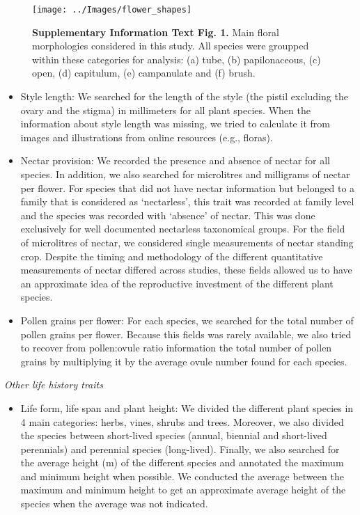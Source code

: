 \documentclass[
  12pt,
]{article}
\providecommand{\tightlist}{%
  \setlength{\itemsep}{0pt}\setlength{\parskip}{0pt}}
\begin{document}
\begin{figure}[h]

{\centering \texttt{[image: ../Images/flower\_shapes]} 

}

\caption{\textbf{Supplementary Information Text Fig. 1.}  Main floral morphologies considered in this study. All species were groupped within these categories for analysis: (a) tube, (b) papilonaceous, (c) open, (d) capitulum, (e) campanulate and (f) brush.}\label{fig:pressure}
\end{figure}

\begin{itemize}
\item
  Style length: We searched for the length of the style (the pistil
  excluding the ovary and the stigma) in millimeters for all plant
  species. When the information about style length was missing, we tried
  to calculate it from images and illustrations from online resources
  (e.g., floras).
\item
  Nectar provision: We recorded the presence and absence of nectar for
  all species. In addition, we also searched for microlitres and
  milligrams of nectar per flower. For species that did not have nectar
  information but belonged to a family that is considered as
  `nectarless', this trait was recorded at family level and the species
  was recorded with `absence' of nectar. This was done exclusively for
  well documented nectarless taxonomical groups. For the field of
  microlitres of nectar, we considered single measurements of nectar
  standing crop. Despite the timing and methodology of the different
  quantitative measurements of nectar differed across studies, these
  fields allowed us to have an approximate idea of the reproductive
  investment of the different plant species.
\item
  Pollen grains per flower: For each species, we searched for the total
  number of pollen grains per flower. Because this fields was rarely
  available, we also tried to recover from pollen:ovule ratio
  information the total number of pollen grains by multiplying it by the
  average ovule number found for each species.
\end{itemize}

\emph{Other life history traits}

\begin{itemize}
\tightlist
\item
  Life form, life span and plant height: We divided the different plant
  species in 4 main categories: herbs, vines, shrubs and trees.
  Moreover, we also divided the species between short-lived species
  (annual, biennial and short-lived perennials) and perennial species
  (long-lived). Finally, we also searched for the average height (m) of
  the different species and annotated the maximum and minimum height
  when possible. We conducted the average between the maximum and
  minimum height to get an approximate average height of the species
  when the average was not indicated.
\end{itemize}
\end{document}
